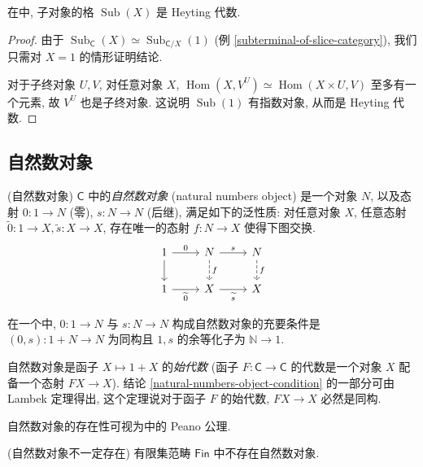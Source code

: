 \begin{prop}
	{}
	在\topos{}中, 子对象的格 $\operatorname{Sub}(X)$ 是 Heyting 代数.
\end{prop}

\begin{proof}
	由于
	$\operatorname{Sub}_{\mathsf C}(X) \simeq \operatorname{Sub}_{\mathsf C/X}(1)$
	(例 \ref{subterminal-of-slice-category}),
	我们只需对 $X=1$ 的情形证明结论.
	
	对于子终对象 $U,V$, 对任意对象 $X$, $\operatorname{Hom}(X,V^U)\simeq \operatorname{Hom}(X\times U,V)$ 至多有一个元素, 故 $V^U$ 也是子终对象. 这说明 $\operatorname{Sub}(1)$ 有指数对象, 从而是 Heyting 代数.
\end{proof}

\subsection{自然数对象}

\begin{definition}
    {(自然数对象)}
    \topos{} $\mathsf C$ 中的\emph{自然数对象} (natural numbers object) 是一个对象 $N$,
    以及态射 $0 \colon 1 \to N$ (零),
    $s \colon N \to N$ (后继),
    满足如下的泛性质: 对任意对象 $X$,
    任意态射 $\widetilde 0\colon 1\to X,\widetilde s\colon X\to X$,
    存在唯一的态射 $f\colon N\to X$ 使得下图交换.
\[\begin{tikzcd}[ampersand replacement=\&]
	1 \& N \& N \\
	1 \& X \& X
	\arrow[from=1-1, to=2-1]
	\arrow["0", from=1-1, to=1-2]
	\arrow["s", from=1-2, to=1-3]
	\arrow["{\widetilde 0}"', from=2-1, to=2-2]
	\arrow["{\widetilde s}"', from=2-2, to=2-3]
	\arrow["f", dashed, from=1-2, to=2-2]
	\arrow["f", dashed, from=1-3, to=2-3]
\end{tikzcd}\]
\end{definition}

\begin{prop}
	[label={natural-numbers-object-condition}]
	{}
	在一个\topos{}中, $0\colon 1\to N$ 与 $s\colon N\to N$ 构成自然数对象的充要条件是 $(0,s)\colon 1+N\to N$ 为同构且 $1,s$ 的余等化子为 $\mathbb{N}\to 1$.
\end{prop}
\begin{remark}
	{}
	自然数对象是函子 $X\mapsto 1+X$ 的\emph{始代数} \footnotemark(函子 $F\colon \mathsf C\to \mathsf C$ 的代数是一个对象 $X$ 配备一个态射 $FX\to X$). 结论 \ref{natural-numbers-object-condition} 的一部分可由 Lambek 定理得出, 这个定理说对于函子 $F$ 的始代数, $FX\to X$ 必然是同构.
\end{remark}

\begin{remark}{}
	自然数对象的存在性可视为\topos{}中的 Peano 公理.
\end{remark}

\begin{example}
    {(自然数对象不一定存在)}
    有限集范畴 $\mathsf {Fin}$ 中不存在自然数对象.
\end{example}


